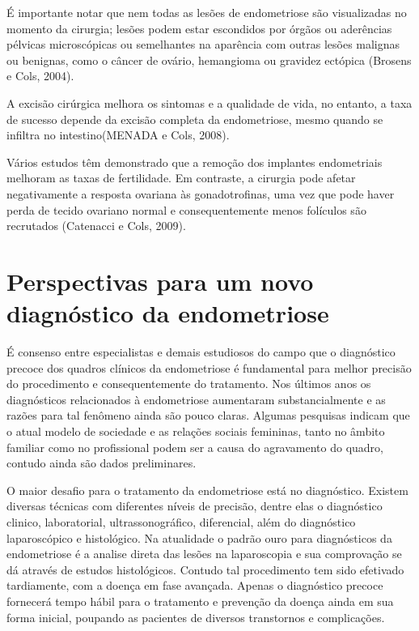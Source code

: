 \documentclass[12pt]{article} %
\begin{document}
É importante notar que nem todas as lesões de endometriose são
visualizadas no momento da cirurgia; lesões podem estar escondidos por
órgãos ou aderências pélvicas microscópicas ou semelhantes na
aparência com outras lesões malignas ou benignas, como o câncer de
ovário, hemangioma ou gravidez ectópica (Brosens e Cols, 2004).

A excisão cirúrgica
melhora os sintomas e a qualidade de vida, no entanto, a taxa de
sucesso depende da excisão completa da endometriose, mesmo
quando se infiltra no intestino(MENADA e Cols, 2008).

Vários estudos têm demonstrado que a remoção dos implantes
endometriais melhoram as taxas de fertilidade. Em contraste, a
cirurgia pode afetar negativamente a resposta ovariana às gonadotrofinas, uma vez que pode haver perda de tecido ovariano normal e consequentemente menos folículos são recrutados (Catenacci e Cols, 2009).


\section{Perspectivas para um novo diagnóstico da endometriose}



É consenso entre especialistas e demais estudiosos do campo que o diagnóstico precoce dos quadros clínicos da endometriose é fundamental para melhor precisão do procedimento e consequentemente do tratamento. Nos últimos anos os diagnósticos relacionados à endometriose aumentaram substancialmente e as razões para tal fenômeno ainda são pouco claras. Algumas pesquisas indicam que o atual modelo de sociedade e as relações sociais femininas, tanto no âmbito familiar como no profissional podem ser a causa do agravamento do quadro, contudo ainda são dados preliminares.

O maior desafio para o tratamento da endometriose está no diagnóstico. Existem diversas técnicas com diferentes níveis de precisão, dentre elas o diagnóstico clinico, laboratorial, ultrassonográfico, diferencial, além do diagnóstico laparoscópico e histológico.  Na atualidade o padrão ouro para diagnósticos da endometriose é a analise direta das lesões na laparoscopia e sua comprovação se dá através de estudos histológicos. Contudo tal procedimento tem sido efetivado tardiamente, com a doença em fase avançada. Apenas o diagnóstico precoce fornecerá tempo hábil para o tratamento e prevenção da doença ainda em sua forma inicial, poupando as pacientes de diversos transtornos e complicações.
\end{document}

